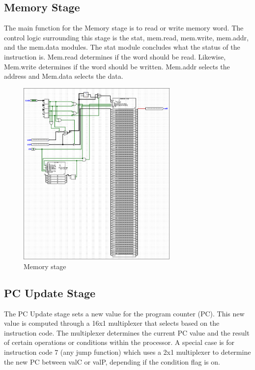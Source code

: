 \documentclass{article}
\begin{document}
\subsection{Memory Stage}

The main function for the Memory stage is to read or write memory word. 
The control logic surrounding this stage is the stat, mem.read, mem.write, mem.addr, and the mem.data modules. 
The stat module concludes what the status of the instruction is. 
Mem.read determines if the word should be read. 
Likewise, Mem.write determines if the word should be written. 
Mem.addr selects the address and Mem.data selects the data. 

\begin{figure}[H]
    \centering
    \includegraphics[width=0.7\textwidth]{./images/memory.png}
    \caption{Memory stage}
\end{figure}

\subsection{PC Update Stage}

The PC Update stage sets a new value for the program counter (PC). 
This new value is computed through a 16x1 multiplexer that selects based on the instruction code. 
The multiplexer determines the current PC value and the result of certain operations or conditions within the processor. 
A special case is for instruction code 7 (any jump function) which uses a 2x1 multiplexer to determine the new PC between valC or valP, depending if the condition flag is on. 
\end{document}
